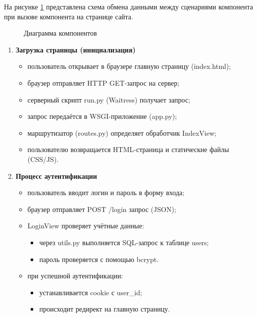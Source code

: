 На рисунке \ref{data:image} представлена схема обмена данными между сценариями компонента при вызове компонента на странице сайта.

\begin{figure}[H]
	\caption{Диаграмма компонентов}
	\label{data:image}
\end{figure}

\begin{enumerate}[leftmargin=*,label=\textbf{\arabic*.}]
	\item \textbf{Загрузка страницы (инициализация)}
	\begin{itemize}
		\item пользователь открывает в браузере главную страницу (index.html);
		\item браузер отправляет HTTP GET-запрос на сервер;
		\item серверный скрипт run.py (Waitress) получает запрос;
		\item запрос передаётся в WSGI-приложение (app.py);
		\item маршрутизатор (routes.py) определяет обработчик IndexView;
		\item пользователю возвращается HTML-страница и статические файлы (CSS/JS).
	\end{itemize}
	
	\item \textbf{Процесс аутентификации}
	\begin{itemize}
		\item пользователь вводит логин и пароль в форму входа;
		\item браузер отправляет POST /login запрос (JSON);
		\item LoginView проверяет учётные данные:
		\begin{itemize}
			\item через utils.py выполняется SQL-запрос к таблице users;
			\item пароль проверяется с помощью bcrypt.
		\end{itemize}
		\item при успешной аутентификации:
		\begin{itemize}
			\item устанавливается cookie с user\_id;
			\item происходит редирект на главную страницу.
		\end{itemize}
	\end{itemize}
	

\end{enumerate}
